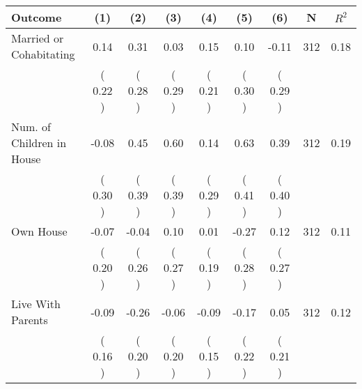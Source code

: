 \begin{tabular}{lcccccccc}
\toprule
 \textbf{Outcome} & \textbf{(1)} & \textbf{(2)} & \textbf{(3)} & \textbf{(4)} & \textbf{(5)} & \textbf{(6)} & \textbf{N} & \textbf{$ R^2$} \\
\midrule
Married or Cohabitating &      0.14 &      0.31 &      0.03 &      0.15 &      0.10 &     -0.11 & 312 &       0.18 \\ 
 & (     0.22 ) & (     0.28 ) & (     0.29 ) & (     0.21 ) & (     0.30 ) & (     0.29 ) & \\
Num. of Children in House &     -0.08 &      0.45 &      0.60 &      0.14 &      0.63 &      0.39 & 312 &       0.19 \\ 
 & (     0.30 ) & (     0.39 ) & (     0.39 ) & (     0.29 ) & (     0.41 ) & (     0.40 ) & \\
Own House &     -0.07 &     -0.04 &      0.10 &      0.01 &     -0.27 &      0.12 & 312 &       0.11 \\ 
 & (     0.20 ) & (     0.26 ) & (     0.27 ) & (     0.19 ) & (     0.28 ) & (     0.27 ) & \\
Live With Parents &     -0.09 &     -0.26 &     -0.06 &     -0.09 &     -0.17 &      0.05 & 312 &       0.12 \\ 
 & (     0.16 ) & (     0.20 ) & (     0.20 ) & (     0.15 ) & (     0.22 ) & (     0.21 ) & \\
\bottomrule
\end{tabular}

